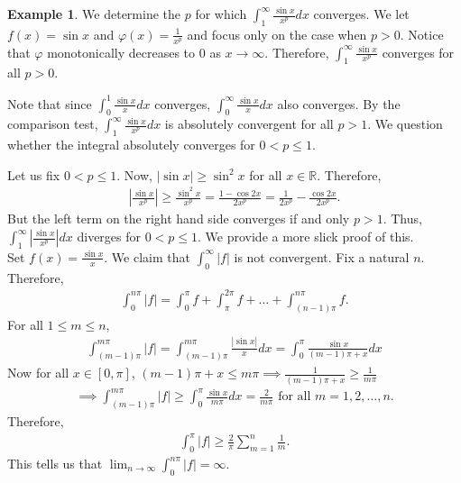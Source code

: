 \documentclass[15pt,a4paper]{book}
\theoremstyle{definition}
\newtheorem{example}[theorem]{Example}
\newcommand{\abs}[1]{\left| #1 \right|} %
\newcommand{\R}{\mathbb{R}} %
\begin{document}
\begin{example}
    We determine the $p$ for which $\int_{1}^{\infty} \frac{\sin x}{x^{p}} dx$ converges. We let $f(x) = \sin x$ and $\varphi(x) = \frac{1}{x^{p}}$ and focus only on the case when $p > 0$. Notice that $\varphi$ monotonically decreases to $0$ as $x \to \infty$. Therefore, $\int_{1}^{\infty} \frac{\sin x}{x^{p}}$ converges for all $p > 0$.

    Note that since $\int_{0}^{1} \frac{\sin x}{x} dx$ converges, $\int_{0}^{\infty} \frac{\sin x}{x} dx$ also converges. By the comparison test, $\int_{1}^{\infty} \frac{\sin x}{x^{p}} dx$ is absolutely convergent for all $p > 1$. We question whether the integral absolutely converges for $0 < p \leq 1$.

    Let us fix $0 < p \leq 1$. Now, $\abs{\sin x} \geq \sin^{2}x$ for all $x \in \R$. Therefore,
    \begin{align}
        \abs{\frac{\sin x}{x^{p}}} \geq \frac{\sin^{2}x}{x^{p}} = \frac{1-\cos 2x}{2x^{p}} = \frac{1}{2x^{p}} - \frac{\cos 2x}{2x^{p}}.
    \end{align}
    But the left term on the right hand side converges if and only $p > 1$. Thus, $\int_{1}^{\infty} \abs{\frac{\sin x}{x^{p}}}dx$ diverges for $0 < p \leq 1$. We provide a more slick proof of this.\\

    Set $f(x) = \frac{\sin x}{x}$. We claim that $\int_{0}^{\infty} \abs{f}$ is not convergent. Fix a natural $n$. Therefore,
    \begin{align}
        \int_{0}^{n\pi} \abs{f} = \int_{0}^{\pi} f + \int_{\pi}^{2\pi} f + \ldots + \int_{(n-1)\pi}^{n\pi} f.
    \end{align}
    For all $1 \leq m \leq n$,
    \begin{align}
        \int_{(m-1)\pi}^{m\pi} \abs{f} = \int_{(m-1)\pi}^{m\pi} \frac{\abs{\sin x}}{x} dx = \int_{0}^{\pi} \frac{\sin x}{(m-1)\pi + x}dx
    \end{align}
    Now for all $x \in [0,\pi]$, $(m-1)\pi + x \leq m\pi \implies \frac{1}{(m-1)\pi+x} \geq \frac{1}{m\pi}$
    \begin{align}
        \implies \int_{(m-1)\pi}^{m\pi} \abs{f} \geq \int_{0}^{\pi} \frac{\sin x}{m \pi} dx = \frac{2}{m \pi} \text{ for all } m = 1,2, \ldots, n.
    \end{align}
    Therefore,
    \begin{align}
        \int_{0}^{\pi} \abs{f} \geq \frac{2}{\pi} \sum_{m=1}^{n} \frac{1}{m}.
    \end{align}
    This tells us that $\lim_{n \to \infty} \int_{0}^{n \pi} \abs{f} = \infty$.
\end{example}
\end{document}
